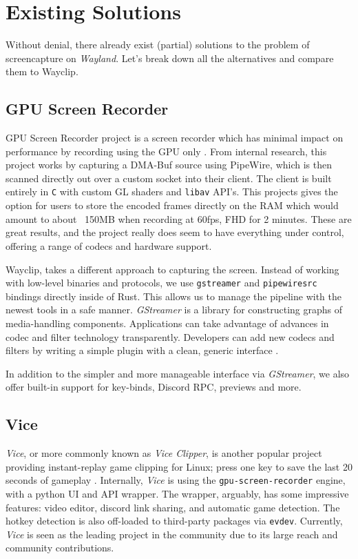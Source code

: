 \section{Existing Solutions}

Without denial, there already exist (partial) solutions to the problem of screencapture on \emph{Wayland}. Let's break down all the alternatives and compare them to Wayclip.

\subsection{GPU Screen Recorder}

GPU Screen Recorder project is a screen recorder which has minimal impact on performance by recording using the GPU only \cite{gpu_screen_recorder}.
From internal research, this project works by capturing a DMA-Buf source using PipeWire, which is then scanned directly out over a custom socket into their client. The client is built entirely in \lstinline|C| with custom GL shaders and \lstinline|libav| API's.
This projects gives the option for users to store the encoded frames directly on the RAM which would amount to about ~150MB when recording at 60fps, FHD for 2 minutes. These are great results, and the project really does seem to have everything under control,
offering a range of codecs and hardware support.

Wayclip, takes a different approach to capturing the screen. Instead of working with low-level binaries and protocols, we use \lstinline|gstreamer| and \lstinline|pipewiresrc| bindings directly inside of Rust.
This allows us to manage the pipeline with the newest tools in a safe manner. \emph{GStreamer} is a library for constructing graphs of media-handling components. Applications can take advantage of advances in codec and filter technology transparently. Developers can add new codecs and filters by writing a simple plugin with a clean, generic interface \cite{gstreamer}.

In addition to the simpler and more manageable interface via \emph{GStreamer}, we also offer built-in support for key-binds, Discord RPC, previews and more.

\subsection{Vice}

\emph{Vice}, or more commonly known as \emph{Vice Clipper}, is another popular project providing instant-replay game clipping for Linux; press one key to save the last 20 seconds of gameplay \cite{vice_clipper}.
Internally, \emph{Vice} is using the \lstinline|gpu-screen-recorder| engine, with a python UI and API wrapper.
The wrapper, arguably, has some impressive features: video editor, discord link sharing, and automatic game detection. The hotkey detection is also off-loaded to third-party packages via \lstinline|evdev|.
Currently, \emph{Vice} is seen as the leading project in the community due to its large reach and community contributions.

